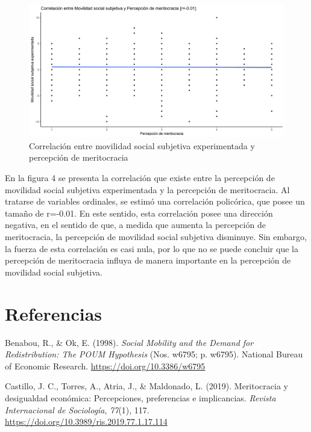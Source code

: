 \documentclass[
]{article}
\begin{document}
\begin{figure}

{\centering \includegraphics[width=0.8\linewidth,height=0.8\textheight]{output/graphs/graf5} 

}

\caption{Correlación entre movilidad social subjetiva experimentada y percepción de meritocracia}\label{fig:unnamed-chunk-9}
\end{figure}

En la figura 4 se presenta la correlación que existe entre la percepción
de movilidad social subjetiva experimentada y la percepción de
meritocracia. Al tratarse de variables ordinales, se estimó una
correlación policórica, que posee un tamaño de r=-0.01. En este sentido,
esta correlación posee una dirección negativa, en el sentido de que, a
medida que aumenta la percepción de meritocracia, la percepción de
movilidad social subjetiva disminuye. Sin embargo, la fuerza de esta
correlación es casi nula, por lo que no se puede concluir que la
percepción de meritocracia influya de manera importante en la percepción
de movilidad social subjetiva.

\newpage

\hypertarget{referencias}{%
\section{Referencias}\label{referencias}}

\hypertarget{refs}{}
\leavevmode\hypertarget{ref-benabou_Social_1998}{}%
Benabou, R., \& Ok, E. (1998). \emph{Social Mobility and the Demand for
Redistribution: The POUM Hypothesis} (Nos. w6795; p. w6795). National
Bureau of Economic Research. \url{https://doi.org/10.3386/w6795}

\leavevmode\hypertarget{ref-castillo_Meritocracia_2019}{}%
Castillo, J. C., Torres, A., Atria, J., \& Maldonado, L. (2019).
Meritocracia y desigualdad económica: Percepciones, preferencias e
implicancias. \emph{Revista Internacional de Sociología}, \emph{77}(1),
117. \url{https://doi.org/10.3989/ris.2019.77.1.17.114}
\end{document}
